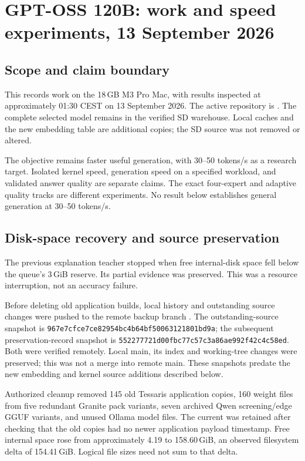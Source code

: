 \section{GPT-OSS 120B: work and speed experiments, 13 September 2026}
\label{sec:gptoss-speed-20260913}

\subsection{Scope and claim boundary}
This records work on the 18\,GB M3 Pro Mac, with results inspected at
approximately 01:30 CEST on 13 September 2026. The active repository is
. The complete selected model remains
in the verified SD warehouse. Local caches and the new embedding table are
additional copies; the SD source was not removed or altered.

The objective remains faster useful generation, with 30--50 tokens/s as a
research target. Isolated kernel speed, generation speed on a specified
workload, and validated answer quality are separate claims. The exact
four-expert and adaptive quality tracks are different experiments. No result
below establishes general generation at 30--50 tokens/s.

\subsection{Disk-space recovery and source preservation}
The previous explanation teacher stopped when free internal-disk space fell
below the queue's 3\,GiB reserve. Its partial evidence was preserved. This
was a resource interruption, not an accuracy failure.

Before deleting old application builds, local history and outstanding source
changes were pushed to the remote backup branch
.
The outstanding-source snapshot is
\texttt{967e7cfce7ce82954bc4b64bf50063121801bd9a}; the subsequent
preservation-record snapshot is
\texttt{552277721d00fbc77c57c3a86ae992f42c4c58ed}.
Both were verified remotely. Local main, its index and working-tree changes
were preserved; this was not a merge into remote main. These snapshots
predate the new embedding and kernel source additions described below.

Authorized cleanup removed 145 old Tessaris application copies, 160 weight
files from five redundant Granite pack variants, seven archived Qwen
screening/edge GGUF variants, and unused Ollama model files. The current
 was retained after checking that the old
copies had no newer application payload timestamp. Free internal space rose
from approximately 4.19 to 158.60\,GiB, an observed filesystem delta of
154.41\,GiB. Logical file sizes need not sum to that delta.

